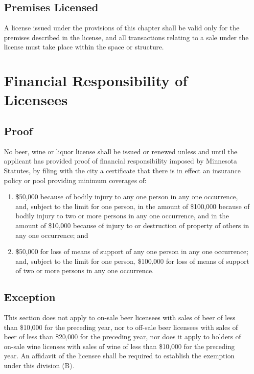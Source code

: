 \subsection{Premises Licensed}
A license issued under the provisions of this chapter shall be valid only for the premises described in the license, and all transactions relating to a sale under the license must take place within the space or structure.

\section{Financial Responsibility of Licensees}
\subsection{Proof}
No beer, wine or liquor license shall be issued or renewed unless and until the applicant has provided proof of financial responsibility imposed by Minnesota Statutes, by filing with the city a certificate that there is in effect an insurance policy or pool providing minimum coverages of:
\begin{enumerate}[{\indent}1)]
    \item \$50,000 because of bodily injury to any one person in any one occurrence, and, subject to the limit for one person, in the amount of \$100,000 because of bodily injury to two or more persons in any one occurrence, and in the amount of \$10,000 because of injury to or destruction of property of others in any one occurrence; and 
    \item \$50,000 for loss of means of support of any one person in any one occurrence; and, subject to the limit for one person, \$100,000 for loss of means of support of two or more persons in any one occurrence.
\end{enumerate}
\subsection{Exception}
This section does not apply to on-sale beer licensees with sales of beer of less than \$10,000 for the preceding year, nor to off-sale beer licensees with sales of beer of less than \$20,000 for the preceding year, nor does it apply to holders of on-sale wine licenses with sales of wine of less than \$10,000 for the preceding year.  An affidavit of the licensee shall be required to establish the exemption under this division (B).
